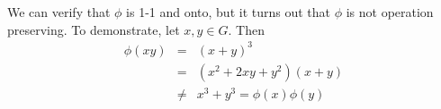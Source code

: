 \documentclass{article}\usepackage{amssymb}
\begin{document}
We can verify that $\phi$ is 1-1 and onto, but it turns out that $\phi$ is not operation
preserving. To demonstrate, let $x,y \in G$. Then
\begin{eqnarray*}
\phi(xy) &=& (x+y)^{3} \\
&=& (x^{2} + 2xy + y^{2})(x+y) \\
&\ne& x^{3} + y^{3} = \phi(x)\phi(y)
\end{eqnarray*}
\end{document}
